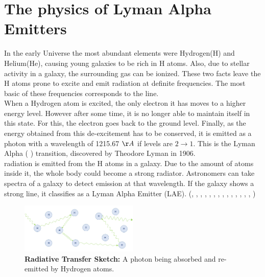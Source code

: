 \documentclass[twocolappendix]{latex/emulateapj}
\begin{document}
\section{The physics of Lyman Alpha Emitters}
\label{sec1:laes}
In the early Universe the most abundant elements were Hydrogen(H) and Helium(He), causing young galaxies to be rich in H atoms. Also, due to stellar activity in a galaxy, the surrounding gas can be ionized. These two facts leave the H atoms prone to excite and emit radiation at definite frequencies. The most basic of these frequencies corresponds to the \lya line. \cite{PartridgePeebles}  \\

When a Hydrogen atom is excited, the only electron it has moves to a higher energy level. However after some time, it is no longer able to maintain itself in this state. For this, the electron goes back to the ground level. Finally, as the energy obtained from this de-excitement has to be conserved, it is emitted as a photon with a wavelength of 1215.67 $\AA$ if levels are $2\rightarrow1$. This is the Lyman Alpha ( \lya) transition, discovered by Theodore Lyman in 1906. \cite{LymanBio} \\

\lya radiation is emitted from the H atoms in a galaxy. Due to the amount of atoms inside it, the whole body could become a strong \lya radiator. Astronomers can take spectra of a galaxy to detect emission at that wavelength. If the galaxy shows a strong \lya line, it classifies as a Lyman Alpha Emitter (LAE). (\cite{DjorgovskiThompson}, \cite{Rhoads00}, \cite{Gawiser2007}, \cite{Koehler2007}, \cite{Ouchi08}, \cite{Yamada2012}, \cite{Schenker2012}, \cite{Kulas12}, \cite{Yamada2012}, \cite{Chonis2013}, \cite{Finkelstein2013}, \cite{Ostlin14}, \cite{Hayes2014}, \cite{Faisst2014}, \cite{Fumagalli2015}) \\

\begin{figure}[h!]
	\begin{center}
		\includegraphics[width=0.5\textwidth]{./figures/radiative_transfer}
	\end{center}
	\caption{\textbf{Radiative Transfer Sketch:} A \lya photon being absorbed and re-emitted by Hydrogen atoms. 
		\label{fig:radiative_transfer}}
\end{figure}
\end{document}

